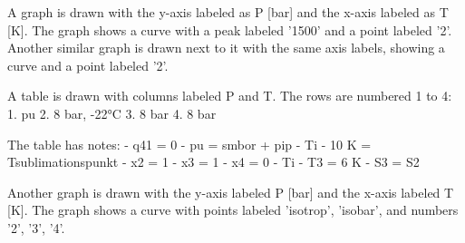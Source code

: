 A graph is drawn with the y-axis labeled as P [bar] and the x-axis labeled as T [K]. The graph shows a curve with a peak labeled '1500' and a point labeled '2'. Another similar graph is drawn next to it with the same axis labels, showing a curve and a point labeled '2'. 

A table is drawn with columns labeled P and T. The rows are numbered 1 to 4:
1. pu
2. 8 bar, -22°C
3. 8 bar
4. 8 bar

The table has notes:
- q41 = 0
- pu = smbor + pip
- Ti - 10 K = Tsublimationspunkt
- x2 = 1
- x3 = 1
- x4 = 0
- Ti - T3 = 6 K
- S3 = S2

Another graph is drawn with the y-axis labeled P [bar] and the x-axis labeled T [K]. The graph shows a curve with points labeled 'isotrop', 'isobar', and numbers '2', '3', '4'.